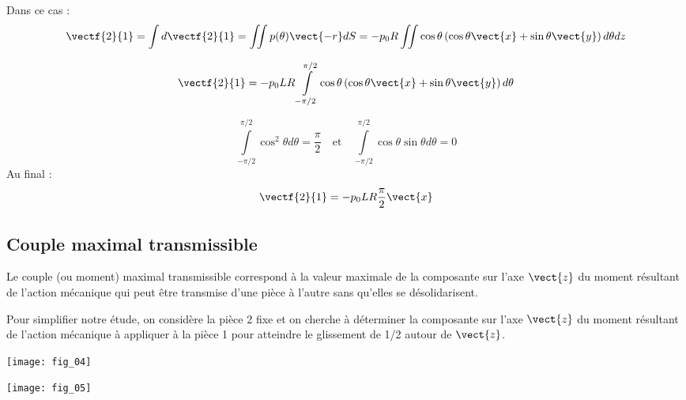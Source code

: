 %
\ifprof
\begin{corrige}

Dans ce cas : 
$$
\vectf{2}{1} = \int d\vectf{2}{1} = \iint p(\theta) \vect{-r} dS 
= - p_0R\iint\cos\theta  \left(\cos\theta\vect{x}+\sin\theta\vect{y} \right)  d\theta dz$$

$$
\vectf{2}{1} 
= - p_0 L R\int\limits_{-\pi/2}^{\pi/2}\cos\theta  \left(\cos\theta\vect{x}+\sin\theta\vect{y} \right)  d\theta$$

$$
\int\limits_{-\pi/2}^{\pi/2}\cos^2\theta  d\theta = \dfrac{\pi}{2}
\quad 
\text{et}
\quad
\int\limits_{-\pi/2}^{\pi/2}\cos\theta \sin\theta  d\theta = 0
$$
Au final :
$$
\vectf{2}{1} 
= - p_0 L R \dfrac{\pi}{2}\vect{x}$$
\end{corrige}
\else
\fi




\subsection*{Couple maximal transmissible}


Le couple (ou moment) maximal transmissible correspond à la valeur maximale 
de la composante sur l’axe $\vect{z}$ du moment résultant de l’action mécanique qui peut 
être transmise d’une pièce à l’autre sans qu’elles se désolidarisent. 
 
Pour simplifier notre étude, on considère la pièce 2 fixe et on cherche à 
déterminer la composante sur l’axe $\vect{z}$ du moment résultant de l’action mécanique 
à appliquer à la pièce 1 pour atteindre le glissement de 1/2 autour de $\vect{z}$.
 

\begin{marginfigure}
\texttt{[image: fig\_04]}
\end{marginfigure}





\begin{marginfigure}
\texttt{[image: fig\_05]}
\end{marginfigure}



